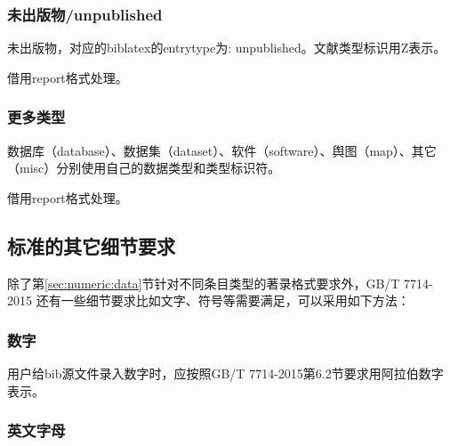 \subsubsection{未出版物/unpublished}
\begin{refentry}{}{}
未出版物，对应的biblatex的entrytype为: unpublished。文献类型标识用Z表示。

 借用report格式处理。
\end{refentry}

\subsubsection{更多类型}
\begin{refentry}{}{}
数据库（database）、数据集（dataset）、软件（software）、舆图（map）、其它（misc）分别使用自己的数据类型和类型标识符。

 借用report格式处理。
\end{refentry}



\subsection{标准的其它细节要求}

除了第\ref{sec:numeric:data}节针对不同条目类型的著录格式要求外，GB/T 7714-2015 还有一些细节要求比如文字、符号等需要满足，可以采用如下方法：

\subsubsection{数字}\label{sec:fmt:number}

\begin{property}{}{}
用户给bib源文件录入数字时，应按照GB/T 7714-2015第6.2节要求用阿拉伯数字表示。
\end{property}

\subsubsection{英文字母}\label{sec:fmt:lettercase}

